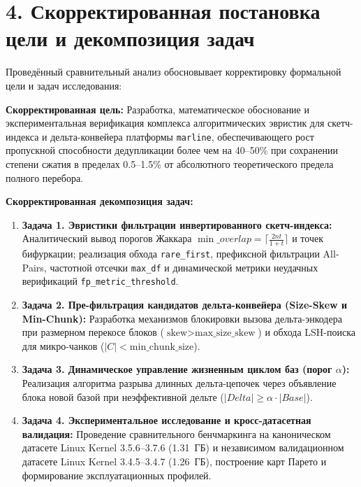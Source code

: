 \documentclass[a4paper,14pt]{extarticle}
\begin{document}
\section*{4. Скорректированная постановка цели и декомпозиция задач}

Проведённый сравнительный анализ обосновывает корректировку формальной цели и задач исследования:

\textbf{Скорректированная цель:} Разработка, математическое обоснование и экспериментальная верификация комплекса алгоритмических эвристик для скетч-индекса и дельта-конвейера платформы \texttt{marline}, обеспечивающего рост пропускной способности дедупликации более чем на 40--50\% при сохранении степени сжатия в пределах 0.5--1.5\% от абсолютного теоретического предела полного перебора.

\textbf{Скорректированная декомпозиция задач:}
\begin{enumerate}
    \item \textbf{Задача 1. Эвристики фильтрации инвертированного скетч-индекса:}
    Аналитический вывод порогов Жаккара $\min\_overlap = \lceil \frac{2nt}{1+t} \rceil$ и точек бифуркации; реализация обхода \texttt{rare\_first}, префиксной фильтрации All-Pairs, частотной отсечки \texttt{max\_df} и динамической метрики неудачных верификаций \texttt{fp\_metric\_threshold}.

    \item \textbf{Задача 2. Пре-фильтрация кандидатов дельта-конвейера (Size-Skew и Min-Chunk):}
    Разработка механизмов блокировки вызова дельта-энкодера при размерном перекосе блоков ($\text{skew} > \text{max\_size\_skew}$) и обхода LSH-поиска для микро-чанков ($|C| < \text{min\_chunk\_size}$).

    \item \textbf{Задача 3. Динамическое управление жизненным циклом баз (порог $\alpha$):}
    Реализация алгоритма разрыва длинных дельта-цепочек через объявление блока новой базой при неэффективной дельте ($|Delta| \ge \alpha \cdot |Base|$).

    \item \textbf{Задача 4. Экспериментальное исследование и кросс-датасетная валидация:}
    Проведение сравнительного бенчмаркинга на каноническом датасете Linux Kernel 3.5.6--3.7.6 (1.31~ГБ) и независимом валидационном датасете Linux Kernel 3.4.5--3.4.7 (1.26~ГБ), построение карт Парето и формирование эксплуатационных профилей.
\end{enumerate}
\end{document}
